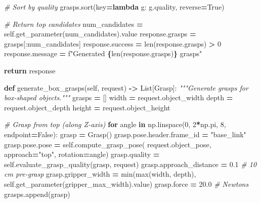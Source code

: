 \documentclass[
]{article}
\newenvironment{Shaded}{\begin{snugshade}}{\end{snugshade}}
\newcommand{\BuiltInTok}[1]{#1}
\newcommand{\CommentTok}[1]{\textcolor[rgb]{0.56,0.35,0.01}{\textit{#1}}}
\newcommand{\ControlFlowTok}[1]{\textcolor[rgb]{0.13,0.29,0.53}{\textbf{#1}}}
\newcommand{\DecValTok}[1]{\textcolor[rgb]{0.00,0.00,0.81}{#1}}
\newcommand{\FloatTok}[1]{\textcolor[rgb]{0.00,0.00,0.81}{#1}}
\newcommand{\KeywordTok}[1]{\textcolor[rgb]{0.13,0.29,0.53}{\textbf{#1}}}
\newcommand{\NormalTok}[1]{#1}
\newcommand{\OperatorTok}[1]{\textcolor[rgb]{0.81,0.36,0.00}{\textbf{#1}}}
\newcommand{\SpecialCharTok}[1]{\textcolor[rgb]{0.81,0.36,0.00}{\textbf{#1}}}
\newcommand{\SpecialStringTok}[1]{\textcolor[rgb]{0.31,0.60,0.02}{#1}}
\newcommand{\StringTok}[1]{\textcolor[rgb]{0.31,0.60,0.02}{#1}}
\newcommand{\VariableTok}[1]{\textcolor[rgb]{0.00,0.00,0.00}{#1}}
\begin{document}
\begin{Shaded}
\begin{Highlighting}[]
        \CommentTok{\# Sort by quality}
\NormalTok{        grasps.sort(key}\OperatorTok{=}\KeywordTok{lambda}\NormalTok{ g: g.quality, reverse}\OperatorTok{=}\VariableTok{True}\NormalTok{)}

        \CommentTok{\# Return top candidates}
\NormalTok{        num\_candidates }\OperatorTok{=} \VariableTok{self}\NormalTok{.get\_parameter(}\StringTok{\textquotesingle{}num\_candidates\textquotesingle{}}\NormalTok{).value}
\NormalTok{        response.grasps }\OperatorTok{=}\NormalTok{ grasps[:num\_candidates]}
\NormalTok{        response.success }\OperatorTok{=} \BuiltInTok{len}\NormalTok{(response.grasps) }\OperatorTok{\textgreater{}} \DecValTok{0}
\NormalTok{        response.message }\OperatorTok{=} \SpecialStringTok{f"Generated }\SpecialCharTok{\{}\BuiltInTok{len}\NormalTok{(response.grasps)}\SpecialCharTok{\}}\SpecialStringTok{ grasps"}

        \ControlFlowTok{return}\NormalTok{ response}

    \KeywordTok{def}\NormalTok{ generate\_box\_grasps(}\VariableTok{self}\NormalTok{, request) }\OperatorTok{{-}\textgreater{}}\NormalTok{ List[Grasp]:}
        \CommentTok{"""Generate grasps for box{-}shaped objects."""}
\NormalTok{        grasps }\OperatorTok{=}\NormalTok{ []}
\NormalTok{        width }\OperatorTok{=}\NormalTok{ request.object\_width}
\NormalTok{        depth }\OperatorTok{=}\NormalTok{ request.object\_depth}
\NormalTok{        height }\OperatorTok{=}\NormalTok{ request.object\_height}

        \CommentTok{\# Grasp from top (along Z{-}axis)}
        \ControlFlowTok{for}\NormalTok{ angle }\KeywordTok{in}\NormalTok{ np.linspace(}\DecValTok{0}\NormalTok{, }\DecValTok{2}\OperatorTok{*}\NormalTok{np.pi, }\DecValTok{8}\NormalTok{, endpoint}\OperatorTok{=}\VariableTok{False}\NormalTok{):}
\NormalTok{            grasp }\OperatorTok{=}\NormalTok{ Grasp()}
\NormalTok{            grasp.pose.header.frame\_id }\OperatorTok{=} \StringTok{"base\_link"}
\NormalTok{            grasp.pose.pose }\OperatorTok{=} \VariableTok{self}\NormalTok{.compute\_grasp\_pose(}
\NormalTok{                request.object\_pose, approach}\OperatorTok{=}\StringTok{"top"}\NormalTok{, rotation}\OperatorTok{=}\NormalTok{angle)}
\NormalTok{            grasp.quality }\OperatorTok{=} \VariableTok{self}\NormalTok{.evaluate\_grasp\_quality(grasp, request)}
\NormalTok{            grasp.approach\_distance }\OperatorTok{=} \FloatTok{0.1}  \CommentTok{\# 10 cm pre{-}grasp}
\NormalTok{            grasp.gripper\_width }\OperatorTok{=} \BuiltInTok{min}\NormalTok{(}\BuiltInTok{max}\NormalTok{(width, depth), }\VariableTok{self}\NormalTok{.get\_parameter(}\StringTok{\textquotesingle{}gripper\_max\_width\textquotesingle{}}\NormalTok{).value)}
\NormalTok{            grasp.force }\OperatorTok{=} \FloatTok{20.0}  \CommentTok{\# Newtons}
\NormalTok{            grasps.append(grasp)}


\end{Highlighting}
\end{Shaded}
\end{document}
